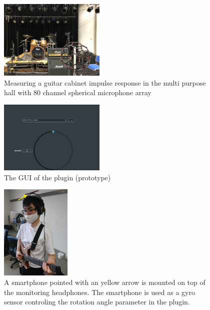 \documentclass[convention,e-brief]{aesconf-current}
\begin{document}
\begin{figure}
    \centering
    \includegraphics[width=0.45\textwidth]{./fig/fullerene_tajigen.jpg}
    \caption{Measuring a guitar cabinet impulse response in the multi purpose hall with 80 channel spherical microphone array}
    \label{fig:fullerene_tajigen}
\end{figure}

\begin{figure}
    \centering
    \includegraphics[width=0.45\textwidth]{./fig/gui.png}
    \caption{The GUI of the plugin (prototype)}
    \label{fig:gui}
\end{figure}

\begin{figure}
    \centering
    \includegraphics[width=0.3\textwidth]{./fig/headtracker.jpg}
    \caption{A smartphone pointed with an yellow arrow is mounted on top of the monitoring headphones. The smartphone is used as a gyro sensor controling the rotation angle parameter in the plugin.}
    \label{fig:headtracker}
\end{figure}
\end{document}

